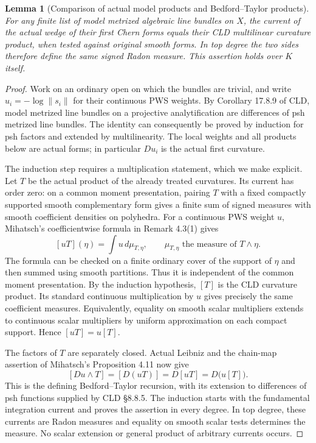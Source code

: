 \documentclass[11pt,a4paper]{article}
\newtheorem{lemma}[theorem]{Lemma}
\theoremstyle{definition}
\theoremstyle{remark}
\begin{document}
\begin{lemma}[Comparison of actual model products and Bedford--Taylor products]
\label{h22c:comparison}
For any finite list of model metrized algebraic line bundles on $X$, the
current of the actual wedge of their first Chern forms equals their
CLD multilinear curvature product, when tested against original smooth
forms.  In top degree the two sides therefore define the same signed
Radon measure.  This assertion holds over $K$ itself.
\end{lemma}

\begin{proof}
Work on an ordinary open on which the bundles are trivial, and write
$u_i=-\log\|s_i\|$ for their continuous PWS weights.  By Corollary
17.8.9 of CLD, model metrized line bundles on a projective
analytification are differences of psh metrized line bundles.  The
identity can consequently be proved by induction for psh factors and
extended by multilinearity.  The local weights and all products below
are actual forms; in particular $Du_i$ is the actual first curvature.

The induction step requires a multiplication statement, which we make
explicit.  Let $T$ be the actual product of the already treated
curvatures.  Its current has order zero: on a common moment
presentation, pairing $T$ with a fixed compactly supported smooth
complementary form gives a finite sum of signed measures with smooth
coefficient densities on polyhedra.  For a continuous PWS weight $u$,
Mihatsch's coefficientwise formula in Remark 4.3(1) gives
\[
             [uT](\eta)=\int u\,d\mu_{T,\eta},
       \qquad \mu_{T,\eta}\text{ the measure of }T\wedge\eta .
\]
The formula can be checked on a finite ordinary cover of the support
of $\eta$ and then summed using smooth partitions.  Thus it is
independent of the common moment presentation.  By the induction
hypothesis, $[T]$ is the CLD curvature product.  Its standard
continuous multiplication by $u$ gives precisely the same coefficient
measures.  Equivalently, equality on smooth scalar multipliers extends
to continuous scalar multipliers by uniform approximation on each
compact support.  Hence $[uT]=u[T]$.

The factors of $T$ are separately closed.  Actual Leibniz and the
chain-map assertion of Mihatsch's Proposition 4.11 now give
\[
 [Du\wedge T]=[D(uT)]=D[uT]=D\bigl(u[T]\bigr).
\]
This is the defining Bedford--Taylor recursion, with its extension to
differences of psh functions supplied by CLD \S8.8.5.  The induction
starts with the fundamental integration current and proves the
assertion in every degree.  In top degree, these currents are Radon
measures and equality on smooth scalar tests determines the measure.
No scalar extension or general product of arbitrary currents occurs.
\end{proof}
\end{document}

